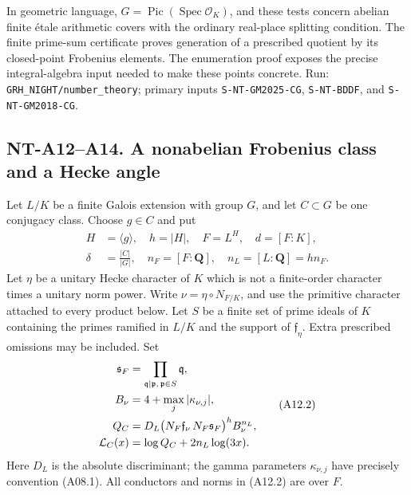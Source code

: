 In geometric language, \(G=\operatorname{Pic}
(\operatorname{Spec}\mathcal O_K)\), and these tests concern
abelian finite \'etale arithmetic covers with the ordinary
real-place splitting condition. The finite prime-sum
certificate proves generation of a prescribed quotient
by its closed-point Frobenius elements. The enumeration
proof exposes the precise integral-algebra input needed
to make these points concrete. Run:
\texttt{GRH\_NIGHT/number\_theory}; primary inputs
\texttt{S-NT-GM2025-CG}, \texttt{S-NT-BDDF},
and \texttt{S-NT-GM2018-CG}.



\subsection*{NT-A12--A14. A nonabelian Frobenius class and a Hecke angle}

Let \(L/K\) be a finite Galois extension with group \(G\), and let
\(C\subset G\) be one conjugacy class. Choose \(g\in C\) and put
\[
 \begin{aligned}
 H&=\langle g\rangle,\quad h=|H|,\quad F=L^H,\quad d=[F:K],\\
 \delta&=\frac{|C|}{|G|},\quad n_F=[F:\mathbf Q],\quad
                              n_L=[L:\mathbf Q]=h n_F .
 \end{aligned}
                                                               \tag{A12.1}
\]
Let \(\eta\) be a unitary Hecke character of \(K\) which is not a
finite-order character times a unitary norm power. Write
\(\nu=\eta\circ N_{F/K}\), and use the primitive character attached
to every product below. Let \(S\) be a finite set of prime ideals of
\(K\) containing the primes ramified in \(L/K\) and the support of
\(\mathfrak f_\eta\). Extra prescribed omissions may be included.
Set
\[
 \begin{aligned}
 \mathfrak s_F&=\prod_{\mathfrak q\mid\mathfrak p,\,
                                      \mathfrak p\in S}\mathfrak q,\\
 B_\nu&=4+\max_j|\kappa_{\nu,j}|,\\
 Q_C&=D_L
       \bigl(N_F\mathfrak f_\nu\,N_F\mathfrak s_F\bigr)^h
       B_\nu^{n_L},\\
 {\cal L}_C(x)&=\log Q_C+2n_L\log(3x).
 \end{aligned}                                                 \tag{A12.2}
\]
Here \(D_L\) is the absolute discriminant; the gamma parameters
\(\kappa_{\nu,j}\) have precisely convention (A08.1).
All conductors and norms in (A12.2) are over \(F\).

